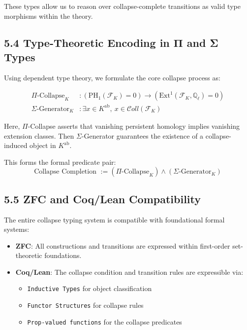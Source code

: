 \documentclass[11pt]{article}
\begin{document}
These types allow us to reason over collapse-complete transitions as valid type morphisms within the theory.

\subsection{5.4 Type-Theoretic Encoding in Π and Σ Types}

Using dependent type theory, we formulate the core collapse process as:

\begin{align*}
\Pi\text{-Collapse}_{K} &\colon \left(\mathrm{PH}_1(\mathcal{F}_K) = 0\right) \rightarrow \left(\mathrm{Ext}^1(\mathcal{F}_K, \mathbb{Q}_\ell) = 0\right) \\
\Sigma\text{-Generator}_{K} &\colon \exists x \in K^{\mathrm{ab}},\ x \in \mathcal{C}oll(\mathcal{F}_K)
\end{align*}

Here, \( \Pi \)-Collapse asserts that vanishing persistent homology implies vanishing extension classes.  
Then \( \Sigma \)-Generator guarantees the existence of a collapse-induced object in \( K^{\mathrm{ab}} \).

This forms the formal predicate pair:
\[
\text{Collapse Completion } := (\Pi\text{-Collapse}_K) \wedge (\Sigma\text{-Generator}_K)
\]

\subsection{5.5 ZFC and Coq/Lean Compatibility}

The entire collapse typing system is compatible with foundational formal systems:

\begin{itemize}
    \item \textbf{ZFC}: All constructions and transitions are expressed within first-order set-theoretic foundations.
    \item \textbf{Coq/Lean}: The collapse condition and transition rules are expressible via:
        \begin{itemize}
            \item \texttt{Inductive Types} for object classification
            \item \texttt{Functor Structures} for collapse rules
            \item \texttt{Prop-valued functions} for the collapse predicates
        \end{itemize}
\end{itemize}
\end{document}
